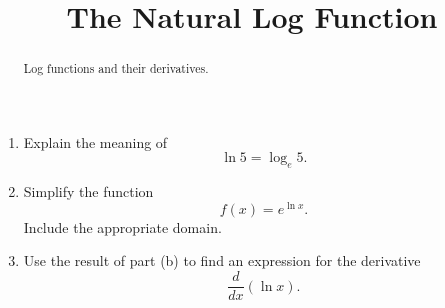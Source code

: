\documentclass{ximera}
\title{The Natural Log Function}
\begin{document}
\begin{abstract}
Log functions and their derivatives.
\end{abstract}
\maketitle

\begin{question} \label{Qdfggghghhfll}

\begin{enumerate}
\item Explain the meaning of 
\[
  \ln 5 = \log_e 5 .
\]

\item Simplify the function
\[
     f(x) = e^{\ln x} .
\]
Include the appropriate domain.

\item Use the result of part (b) to find an expression for the derivative
\[
 \frac{d}{dx} \left(  \ln x \right ) .
\]

\end{enumerate}
\end{question}
\end{document}

